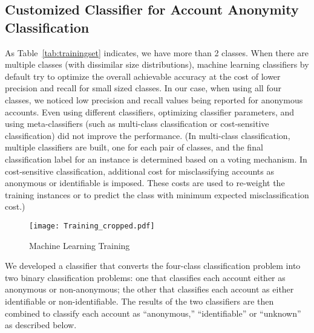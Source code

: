 \documentclass[conference]{IEEEtran}
\begin{document}
\subsection{Customized Classifier for Account Anonymity Classification}
\label{sec:customclassifier}
As Table~\ref{tab:trainingset} indicates, we have more than 2 classes. When there are multiple classes (with dissimilar size distributions), machine learning classifiers by default try to optimize the overall achievable accuracy at the cost of lower precision and recall for small sized classes. In our case, when using all four classes, we noticed low precision and recall values being reported for anonymous accounts. Even using different classifiers,
optimizing classifier parameters, and using meta-classifiers (such as multi-class classification or cost-sensitive classification) did not improve the performance. 
(In multi-class classification, multiple classifiers are built, one for each pair of classes, and the final classification label for an instance is determined based on a voting mechanism. In cost-sensitive classification, additional cost for misclassifying accounts as anonymous or identifiable is imposed. These costs are used to re-weight the training instances or to predict the class with minimum expected misclassification cost.)

\begin{figure}[thbp]
\begin{center}
  \centering
    \caption{Machine Learning Training}
  \label{fig:training}
     \texttt{[image: Training\_cropped.pdf]}

\end{center}
\end{figure}


We developed a classifier that converts the four-class classification problem into two binary classification problems: one that classifies each account either as anonymous or non-anonymous; the other that classifies each account as either identifiable or non-identifiable. The results of the two classifiers are then combined to classify each account as ``anonymous,'' ``identifiable'' or ``unknown'' as described below. 
\end{document}
